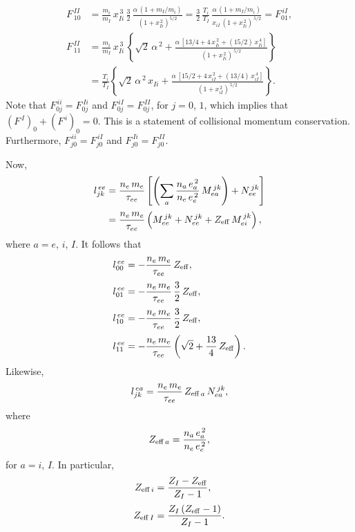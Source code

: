\documentclass[12pt]{article}
\begin{document}
\begin{align}
F^{\,II}_{\,10}&=\frac{m_i}{m_I}\,x_{Ii}^{\,3}\,\frac{3}{2}\,\frac{\alpha\,(1+m_I/m_i)}{(1+x_{Ii}^{\,2})^{5/2}}=\frac{3}{2}\,\frac{T_i}{T_I}\,\frac{\alpha\,(1+m_I/m_i)}{x_{iI}\,(1+x_{Ii}^{\,2})^{\,5/2}}=F^{\,iI}_{01},\\[0.5ex]
F^{\,II}_{\,11}& =\frac{m_i}{m_I}\,x_{Ii}^{\,3}\,\left\{\sqrt{2}\,\alpha^{\,2}+
\frac{\alpha\,[13/4+4\,x_{Ii}^{\,2}+(15/2)\,x_{Ii}^{\,4}]}{(1+x_{Ii}^{\,2})^{\,5/2}}
\right\}\nonumber\\[0.5ex]
&=\frac{T_i}{T_I}\left\{\sqrt{2}\,\alpha^{\,2}\,x_{Ii} + \frac{\alpha\,[
15/2+4\,x_{iI}^{\,2}+(13/4)\,x_{iI}^{\,4}]}{(1+x_{iI}^{\,2})^{\,5/2}}\right\}.
\end{align}
Note that $F^{\,ii}_{0j}=F^{\,Ii}_{0j}$ and $F^{\,iI}_{0j}=F^{\,II}_{0j}$, for $j=0$, $1$, which implies
that $(F^{\,I})_0+(F^{\,i})_0= 0$. This is a statement of collisional momentum conservation.
Furthermore, $F^{\,ii}_{j0}=F^{\,iI}_{j0}$ and $F^{\,Ii}_{j0}=F^{\,II}_{j0}$. 

Now,
\begin{align}
l_{jk}^{\,ee} & = \frac{n_e\,m_e}{\tau_{ee}}\left[\left(\sum_a \frac{n_a\,e_a^{\,2}}{n_e\,e_e^{\,2}}\,M_{ea}^{\,jk}\right) + N_{ee}^{\,jk}\right]\\[0.5ex]
&= \frac{n_e\,m_e}{\tau_{ee}}\left(M_{ee}^{\,jk}+N_{ee}^{\,jk}+Z_{\rm eff}\,M_{ei}^{\,jk}\right),
\end{align}
where $a= e$, $i$, $I$. 
It follows that 
\begin{align}
l^{\,ee}_{00} &= -\frac{n_e\,m_e}{\tau_{ee}}\,Z_{\rm eff},\\[0.5ex]
l^{\,ee}_{01}&= -\frac{n_e\,m_e}{\tau_{ee}}\,\frac{3}{2}\,Z_{\rm eff},\\[0.5ex]
l^{\,ee}_{10}&= -\frac{n_e\,m_e}{\tau_{ee}}\,\frac{3}{2}\,Z_{\rm eff},\\[0.5ex]
l^{\,ee}_{11}& =- \frac{n_e\,m_e}{\tau_{ee}}\left(\sqrt{2} + \frac{13}{4}\,Z_{\rm eff}\right).
\end{align}
Likewise,
\begin{equation}
l_{jk}^{\,ea} = \frac{n_e\,m_e}{\tau_{ee}}\,Z_{{\rm eff}\,a}\,N_{ea}^{\,jk},
\end{equation}
where 
\begin{equation}
Z_{{\rm eff}\,a}= \frac{n_a\,e_a^{\,2}}{n_e\,e_e^{\,2}},
\end{equation}
 for $a=i$, $I$. In particular, 
 \begin{align}
Z_{{\rm eff}\,i}&=\frac{Z_I-Z_{\rm eff}}{Z_I-1},\\[0.5ex]
Z_{{\rm eff}\,I}&= \frac{Z_I\,(Z_{\rm eff}-1)}{Z_I-1}.
\end{align}
\end{document}
